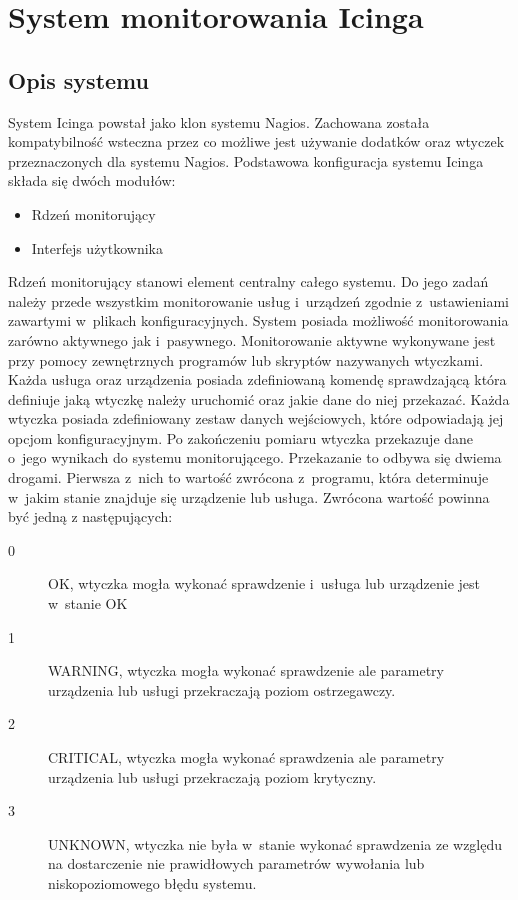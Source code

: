 \chapter{System monitorowania Icinga}
\label{chap:Icinga}

\section[Opis systemu][Opis systemu]{Opis systemu}

System Icinga powstał jako klon systemu Nagios. Zachowana została
kompatybilność wsteczna przez co możliwe jest używanie dodatków oraz
wtyczek przeznaczonych dla systemu Nagios. Podstawowa konfiguracja
systemu Icinga składa się dwóch modułów:

\begin{itemize}
\item Rdzeń monitorujący
\item Interfejs użytkownika
\end{itemize}

Rdzeń monitorujący stanowi element centralny całego systemu. Do jego
zadań należy przede wszystkim monitorowanie usług i~urządzeń zgodnie
z~ustawieniami zawartymi w~plikach konfiguracyjnych. System posiada
możliwość monitorowania zarówno aktywnego jak
i~pasywnego. Monitorowanie aktywne wykonywane jest przy pomocy
zewnętrznych programów lub skryptów nazywanych wtyczkami. Każda usługa
oraz urządzenia posiada zdefiniowaną komendę sprawdzającą która
definiuje jaką wtyczkę należy uruchomić oraz jakie dane do niej
przekazać. Każda wtyczka posiada zdefiniowany zestaw danych
wejściowych, które odpowiadają jej opcjom konfiguracyjnym. Po
zakończeniu pomiaru wtyczka przekazuje dane o~jego wynikach do systemu
monitorującego. Przekazanie to odbywa się dwiema drogami. Pierwsza
z~nich to wartość zwrócona z~programu, która determinuje w~jakim
stanie znajduje się urządzenie lub usługa. Zwrócona wartość powinna
być jedną z następujących:

\begin{description}
\item[0] OK, wtyczka mogła wykonać sprawdzenie i~usługa lub urządzenie
  jest w~stanie OK
\item[1] WARNING, wtyczka mogła wykonać sprawdzenie ale parametry
  urządzenia lub usługi przekraczają poziom ostrzegawczy.
\item[2] CRITICAL, wtyczka mogła wykonać sprawdzenia ale parametry
  urządzenia lub usługi przekraczają poziom krytyczny.
\item[3] UNKNOWN, wtyczka nie była w~stanie wykonać sprawdzenia ze
  względu na dostarczenie nie prawidłowych parametrów wywołania lub
  niskopoziomowego błędu systemu.
\end{description}

